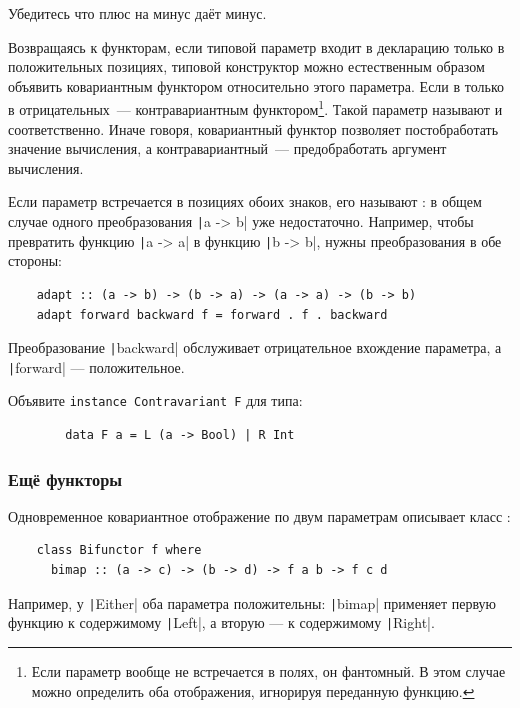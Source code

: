 \begin{task}
    Убедитесь что плюс на минус даёт минус.
\end{task}

Возвращаясь к функторам, если типовой параметр входит в декларацию только в положительных позициях, типовой конструктор можно естественным образом объявить ковариантным функтором относительно этого параметра.
Если в только в отрицательных~--- контравариантным функтором\footnote{Если параметр вообще не встречается в полях, он фантомный. В этом случае можно определить оба отображения, игнорируя переданную функцию.}.
Такой параметр называют  и  соответственно.
Иначе говоря, ковариантный функтор позволяет постобработать значение вычисления, а контравариантный~--- предобработать аргумент вычисления.

Если параметр встречается в позициях обоих знаков, его называют : в общем случае одного преобразования \texttt|a -> b| уже недостаточно.
Например, чтобы превратить функцию \texttt|a -> a| в функцию \texttt|b -> b|, нужны преобразования в обе стороны:
\begin{verbatim}
    adapt :: (a -> b) -> (b -> a) -> (a -> a) -> (b -> b)
    adapt forward backward f = forward . f . backward
\end{verbatim}
Преобразование \texttt|backward| обслуживает отрицательное вхождение параметра, а \texttt|forward| --- положительное.

\begin{task}
    Объявите \texttt{instance Contravariant F} для типа:
    \begin{verbatim}
        data F a = L (a -> Bool) | R Int
    \end{verbatim}
\end{task}

\subsubsection{Ещё функторы}

Одновременное ковариантное отображение по двум параметрам описывает класс :
\begin{verbatim}
    class Bifunctor f where
      bimap :: (a -> c) -> (b -> d) -> f a b -> f c d
\end{verbatim}
Например, у \texttt|Either| оба параметра положительны: \texttt|bimap| применяет первую функцию к содержимому \texttt|Left|, а вторую --- к содержимому \texttt|Right|.

